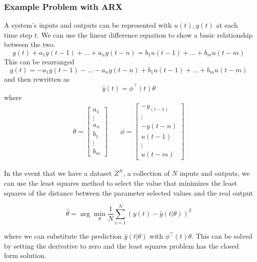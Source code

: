 \subsubsection{Example Problem with ARX}
A system's inputs and outputs can be represented with $u(t), y(t)$ at each time step $t$.
We can use the linear difference equation to show a basic relationship between the two.
\begin{equation}
    y(t) + a_1 y(t-1) + \dots + a_n y(t-n) = b_1 u(t-1) + \dots + b_m u(t-m)
\end{equation}
This can be rearranged 
\begin{equation}
    y(t) = - a_1 y(t-1) - \dots - a_n y(t-n) + b_1 u(t-1) + \dots + b_m u(t-m)
\end{equation}
and then rewritten as
\begin{equation}
    \hat{y}(t) = \phi^\top (t) \theta
\end{equation}
where
\begin{align}
    \theta = 
  \begin{bmatrix}
    a_1 \\ \vdots \\ a_n \\ b_1 \\ \vdots \\ b_m
  \end{bmatrix}
  & \quad \phi =  
  \begin{bmatrix}
    -y_(t-1) \\ \vdots \\ -y(t-n) \\ u(t-1) \\ \vdots \\ u(t-m)
  \end{bmatrix}
\end{align}

In the event that we have a dataset $Z^N$, a collection of $N$ inputs and outputs, we can use the least squares method to select the value that minimizes the least squares of the distance between the parameter selected values and the real output

\begin{equation}
    \hat{\theta} = \arg \min_\theta \frac{1}{N} \sum_{i=1}^{N} (y(t) - \hat{y}(t | \theta))^2
\end{equation}

where we can substitute the prediction $\hat{y}(t|\theta)$ with $\phi^\top(t) \theta$.
This can be solved by setting the derivative to zero and the least squares problem has the closed form solution.

